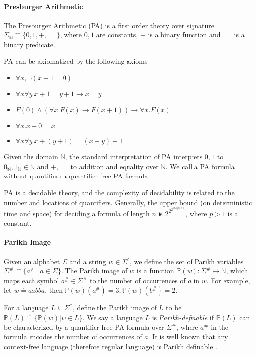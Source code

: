 \documentclass[runningheads]{llncs}
\newcommand{\Def}{\hat{=}}
\begin{document}
\paragraph{Presburger Arithmetic} \label{PA}
The Presburger Arithmetic (PA) is a first order theory over signature 
$\Sigma_\mathbb{N}\Def  \{0,1,+,=\}$, where $0,1$ are constants, 
$+$ is a binary function and $=$ is a binary predicate.

PA can be axiomatized by the following axioms \cite{PA} 

\begin{itemize}
    \item $\forall x, \neg (x+1=0)$
    \item $\forall x \forall y. x+1=y+1 \to x=y$
    \item $F(0) \wedge (\forall x. F(x)\to F(x+1)) \to \forall x. F(x)$ 
    \item $\forall x. x+0=x$
    \item $\forall x \forall y. x+(y+1)=(x+y)+1$
\end{itemize}

Given the domain $\mathbb{N}$,
the standard interpretation of PA interprets 
$0,1$ to $0_\mathbb{N},1_\mathbb{N}\in \mathbb{N}$
and $+,=$ to addition and equality over $\mathbb{N}$.
We call a PA formula without quantifiers a quantifier-free PA formula.

PA is a decidable theory, 
and the complexity of decidability is related to 
the number and locations of quantifiers.
Generally, 
the upper bound (on deterministic time and space) 
for deciding a formula of length $n$ is $2^{2^{2^{p n log(n)}}}$,
where $p>1$ is a constant\cite{Oppen69}. 

\paragraph{Parikh Image}
Given an alphabet $\Sigma$ and a string $w\in \Sigma^*$, 
we define the set of Parikh variables 
$\Sigma^\# \Def \{a^\# \mid a\in \Sigma\}$.
The Parikh image of $w$ is a function 
$\mathbb{P}(w): \Sigma^\# \mapsto \mathbb{N}$,
which maps each symbol $a^\#\in \Sigma^\#$ to the number of occurrences
of $a$ in $w$.
For example, let $w\Def aabba$,
then $\mathbb{P}(w)(a^\#)=3,\mathbb{P}(w)(b^\#)=2$.

For a language $L\subseteq \Sigma^*$, 
define the Parikh image of $L$ to be 
$\mathbb{P}(L)\Def \{\mathbb{P}(w) | w\in L\}$.
We say a language $L$ is \emph{Parikh-definable} 
if $\mathbb{P}(L)$ can be characterized by a quantifier-free PA formula over $\Sigma^\#$, 
where $a^\#$ in the formula encodes the number of occurrences of $a$.
It is well known that
any context-free language (therefore regular language) 
is Parikh definable \cite{Parikh66}.
\end{document}
